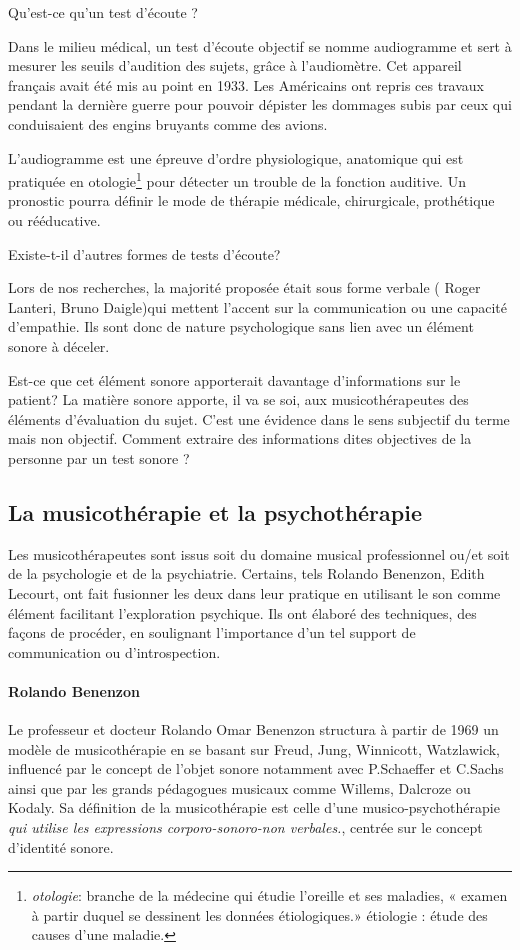 Qu'est-ce qu'un test d'écoute ?

Dans le milieu médical, un test d'écoute objectif se nomme audiogramme et
sert à mesurer les seuils d'audition des sujets, grâce à l'audiomètre. Cet 
appareil français avait été mis au point en 1933. Les Américains
ont repris ces travaux pendant la dernière guerre pour pouvoir dépister
les dommages subis par ceux qui conduisaient des engins bruyants comme
des avions.

L'audiogramme est une épreuve d'ordre physiologique, anatomique qui
est pratiquée en otologie\footnote{\emph{otologie}: branche de la médecine
  qui étudie l'oreille et ses maladies, « examen à partir duquel se
  dessinent les données étiologiques.» étiologie : étude des causes
  d'une maladie.} pour détecter un trouble de la fonction auditive. Un pronostic pourra définir le mode de thérapie
médicale, chirurgicale, prothétique ou rééducative.


Existe-t-il d'autres formes de tests d'écoute?

Lors de  nos recherches, la majorité proposée était sous forme verbale
( Roger Lanteri, Bruno Daigle)qui
mettent l'accent sur la communication ou une capacité d'empathie. Ils
sont donc de nature  psychologique sans lien avec un élément sonore à déceler.

Est-ce que cet élément sonore apporterait davantage d'informations sur
le patient? La matière sonore apporte, il va se soi, aux musicothérapeutes des éléments
 d'évaluation du sujet. C'est une évidence dans le sens subjectif du terme mais non objectif. Comment extraire des informations dites objectives de la personne par un test sonore ?
\subsection{La musicothérapie et la psychothérapie}
	Les musicothérapeutes sont  issus soit du domaine musical professionnel  ou/et soit de  la psychologie et de la psychiatrie. Certains, tels Rolando Benenzon, Edith Lecourt,  ont fait fusionner les deux dans leur pratique  en utilisant le son comme élément facilitant l'exploration psychique. Ils ont élaboré des techniques, des façons de procéder, en soulignant l'importance d'un tel support de communication ou d'introspection. \paragraph{Rolando Benenzon} Le professeur et docteur Rolando Omar Benenzon structura à partir de 1969 un modèle de musicothérapie en se basant sur Freud, Jung, Winnicott, Watzlawick, influencé par le concept de l'objet sonore notamment avec P.Schaeffer et C.Sachs ainsi que par les grands pédagogues musicaux comme Willems, Dalcroze ou Kodaly. Sa définition de la musicothérapie est celle d'une musico-psychothérapie  \emph{\textsl{qui utilise les expressions corporo-sonoro-non verbales.}}, centrée sur le concept d'identité sonore.

